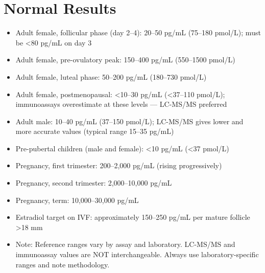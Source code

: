 \section*{Normal Results}
\begin{itemize}
  \item Adult female, follicular phase (day 2--4): 20--50 pg/mL (75--180 pmol/L); must be <80 pg/mL on day 3
  \item Adult female, pre-ovulatory peak: 150--400 pg/mL (550--1500 pmol/L)
  \item Adult female, luteal phase: 50--200 pg/mL (180--730 pmol/L)
  \item Adult female, postmenopausal: <10--30 pg/mL (<37--110 pmol/L); immunoassays overestimate at these levels --- LC-MS/MS preferred
  \item Adult male: 10--40 pg/mL (37--150 pmol/L); LC-MS/MS gives lower and more accurate values (typical range 15--35 pg/mL)
  \item Pre-pubertal children (male and female): <10 pg/mL (<37 pmol/L)
  \item Pregnancy, first trimester: 200--2,000 pg/mL (rising progressively)
  \item Pregnancy, second trimester: 2,000--10,000 pg/mL
  \item Pregnancy, term: 10,000--30,000 pg/mL
  \item Estradiol target on IVF: approximately 150--250 pg/mL per mature follicle >18 mm
  \item Note: Reference ranges vary by assay and laboratory. LC-MS/MS and immunoassay values are NOT interchangeable. Always use laboratory-specific ranges and note methodology.
\end{itemize}

